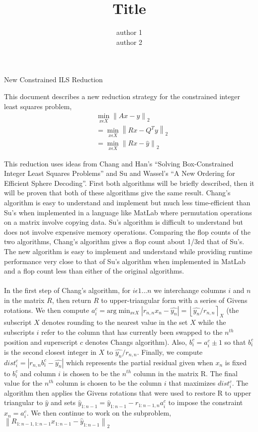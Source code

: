 \documentclass[11pt]{article}	%
\author{author 1\\ author 2}
\title{Title}
\numberwithin{algorithm}{section}
\begin{document}
\begin{center}\begin{large}New Constrained ILS Reduction\end{large}\end{center}
This document describes a new reduction strategy for the constrained integer
least squares problem,
\begin{align*}
&\min_{x\epsilon X}\left \| Ax-y \right \|_2\\
&=\min_{x\epsilon X}\left \| Rx-Q^Ty \right \|_2\\
&=\min_{x\epsilon X}\left \| Rx-\hat{y} \right \|_2
\end{align*}

This reduction uses ideas from Chang and Han's ``Solving Box-Constrained Integer
Least Squares Problems'' and Su and Wassel's ``A New Ordering for Efficient
Sphere Decoding''. First both algorithms will be briefly described, then it will
be proven that both of these algorithms give the same result. Chang's algorithm
is easy to understand and implement but much less time-efficient than
Su's when implemented in a language like MatLab where permutation operations on
a matrix involve copying data. Su's algorithm is difficult to understand but
does not involve expensive memory operations. Comparing the flop counts of the
two algorithms, Chang's algorithm gives a flop count about 1/3rd that of
Su's. The new algorithm is easy to implement and understand while
providing runtime performance very close to that of Su's algorithm when
implemented in MatLab and a flop count less than either of the
original algorithms.\\\\

In the first step of Chang's algorithm, for $i\epsilon 1...n$ we interchange
columns $i$ and $n$ in the matrix $R$, then return $R$ to upper-triangular form
with a series of Givens rotations. We then compute
$a_i^c=\textrm{arg}\min_{x\epsilon X}\left | r_{n,n}x_n - \hat{y_n} \right | =
\left \lfloor\hat{y_n}/r_{n,n}\right \rceil_X$ (the subscript $X$ denotes
rounding to the nearest value in the set $X$ while the subscripts $i$ refer to
the column that has currently been swapped to the $n^{th}$ position and
superscript $c$ denotes Changs algorithm). Also, $b_i^c = a_i^c \pm 1$ so that
$b_i^c$ is the second closest integer in $X$ to $\hat{y_n}/r_{n,n}$. Finally, we
compute $dist_i^c = \left | r_{n,n}b_i^c - \hat{y_n} \right |$ which represents
the partial residual given when $x_n$ is fixed to $b_i^c$ and column $i$ is
chosen to be the $n^{th}$ column in the matrix R. The final value for
the $n^{th}$ column is chosen to be the column $i$ that maximizes $dist_i^c$.
The algorithm then applies the Givens rotations that were used to restore R to
upper triangular to $\hat{y}$ and sets $\hat{y}_{1:n-1} =
\hat{y}_{1:n-1} - r_{1:n-1,n}a_i^c$ to impose the constraint $x_n = a_i^c$. We
then continue to work on the subproblem, $\left \| R_{1:n-1,1:n-1}x_{1:n-1} -
\hat{y}_{1:n-1}\right \|_2$\\\\
\end{document}
